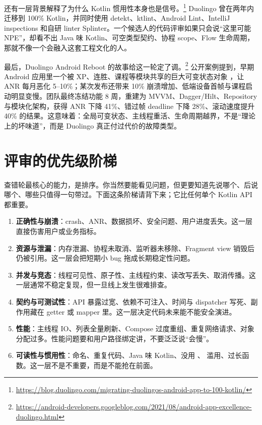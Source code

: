 还有一层背景解释了为什么 Kotlin 惯用性本身也是信号。\srcofficial\footnote{\url{https://blog.duolingo.com/migrating-duolingos-android-app-to-100-kotlin/}} Duolingo 曾在两年内迁移到 100\% Kotlin，并同时使用 detekt、ktlint、Android Lint、IntelliJ inspections 和自研 linter Splinter。一个候选人的代码评审如果只会说“这里可能 NPE”，却看不出 Java 味 Kotlin、可空类型契约、协程 scope、Flow 生命周期，那就不像一个会融入这套工程文化的人。

最后，Duolingo Android Reboot 的故事给这一轮定了调。\srcofficial\footnote{\url{https://android-developers.googleblog.com/2021/08/android-app-excellence-duolingo.html}} 公开案例提到，早期 Android 应用里一个被 XP、连胜、课程等模块共享的巨大可变状态对象 ，让 ANR 每月恶化 5--10\%；某次发布还带来 10\% 崩溃增加、低端设备首帧与课程启动明显变慢。团队最终冻结功能 8 周，重建为 MVVM、Dagger/Hilt、Repository 与模块化架构，获得 ANR 下降 41\%、错过帧 deadline 下降 28\%、滚动速度提升 40\% 的结果。这意味着：全局可变状态、主线程重活、生命周期越界，不是“理论上的坏味道”，而是 Duolingo 真正付过代价的故障类型。

\section{评审的优先级阶梯}

查错轮最核心的能力，是排序。你当然要能看见问题，但更要知道先说哪个、后说哪个、哪些只值得一句带过。下面这条阶梯请背下来；它比任何单个 Kotlin API 都重要。

\begin{enumerate}
  \item \textbf{正确性与崩溃}：crash、ANR、数据损坏、安全问题、用户进度丢失。这一层直接伤害用户或业务指标。
  \item \textbf{资源与泄漏}：内存泄漏、协程未取消、监听器未移除、Fragment view 销毁后仍被引用。这一层会把短期小 bug 拖成长期稳定性问题。
  \item \textbf{并发与竞态}：线程可见性、原子性、主线程约束、读改写丢失、取消传播。这一层通常不稳定复现，但一旦线上发生很难排查。
  \item \textbf{契约与可测试性}：API 暴露过宽、依赖不可注入、时间与 dispatcher 写死、副作用藏在 getter 或 mapper 里。这一层决定代码未来能不能安全演进。
  \item \textbf{性能}：主线程 IO、列表全量刷新、Compose 过度重组、重复网络请求、对象分配过多。性能问题要和用户路径绑定讲，不要泛泛说“会慢”。
  \item \textbf{可读性与惯用性}：命名、重复代码、Java 味 Kotlin、没用 、 滥用、过长函数。这一层不是不重要，而是不能抢在前面。
\end{enumerate}

